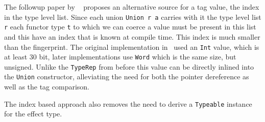 The followup paper by \citeauthor{freer}~\cite{freer} proposes an alternative
source for a tag value, the index in the type level list. Since each union
\texttt{Union r a} carries with it the type level list \texttt{r} each functor
type \texttt{t} to which we can coerce a value must be present in this list and
this have an index that is known at compile time. This index is much smaller
than the fingerprint. The original implementation in~\cite{freer} used an
\texttt{Int} value, which is at least 30 bit, later implementations use
\texttt{Word} which is the same size, but unsigned. Unlike the \texttt{TypeRep}
from before this value can be directly inlined into the \texttt{Union}
constructor, alleviating the need for both the pointer dereference as well as
the tag comparison.

The index based approach also removes the need to derive a \texttt{Typeable}
instance for the effect type.
